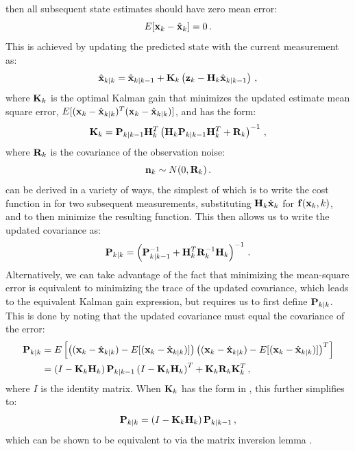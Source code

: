then all subsequent state estimates  should have zero mean error:
\begin{equation}
E[\mathbf x_k - \hat{\mathbf x}_k] = 0 \,.
\end{equation}
This is achieved by updating the predicted state with the current measurement as:
\begin{equation}
\hat{\mathbf x}_{k|k} = \hat{\mathbf x}_{k|k-1} + \mathbf K_k \left( \mathbf z_k - \mathbf H_k \hat{\mathbf x}_{k|k-1}\right)\,,
\end{equation}
where $\mathbf K_k$ is the optimal Kalman gain that minimizes the updated estimate mean square error, $E[(\mathbf x_k - \hat{\mathbf x}_{k|k})^T(\mathbf x_k - \hat{\mathbf x}_{k|k})]$, and has the form:
\begin{equation}\label{eq:KalmanGain}
\mathbf K_k = \mathbf P_{k|k-1} \mathbf H_k^T \left(\mathbf H_k \mathbf P_{k|k-1} \mathbf H_k^T + \mathbf R_k\right)^{-1} \,,
\end{equation}
where $\mathbf R_k$ is the covariance of the observation noise:
\begin{equation}
\mathbf n_k \sim N(0,\mathbf R_k) \,.
\end{equation}
 can be derived in a variety of ways, the simplest of which is to write the cost function in  for two subsequent measurements, substituting $\mathbf H_k \hat{\mathbf x}_k$ for $\mathbf f(\mathbf x_k,k)$, and to then minimize the resulting function.  This then allows us to write the updated covariance as:
\begin{equation} \label{eq:covUpdate}
\mathbf P_{k|k} = \left(\mathbf P_{k|k-1}^{-1} + \mathbf H_k^T \mathbf R_k^{-1} \mathbf H_k \right)^{-1} \,.
\end{equation}
Alternatively, we can take advantage of the fact that minimizing the mean-square error is equivalent to minimizing the trace of the updated covariance, which leads to the equivalent Kalman gain expression, but requires us to first define $\mathbf P_{k|k}$.  This is done by noting that the updated covariance must equal the covariance of the error:
\begin{align}
\mathbf P_{k|k} &= E\left[\left((\mathbf x_k - \hat{\mathbf x}_{k|k}) - E[(\mathbf x_k - \hat{\mathbf x}_{k|k})]\right)\left((\mathbf x_k - \hat{\mathbf x}_{k|k}) - E[(\mathbf x_k - \hat{\mathbf x}_{k|k})]\right)^T\right] \\
&= \left(I - \mathbf K_k \mathbf H_k\right) \mathbf P_{k|k-1} \left(I - \mathbf K_k \mathbf H_k\right)^T + \mathbf K_k \mathbf R_k \mathbf K_k^T\,,
\end{align}
where $I$ is the identity matrix.
When $\mathbf K_k$ has the form in , this further simplifies to:
\begin{equation}
\mathbf P_{k|k} = \left(I - \mathbf K_k \mathbf H_k\right) \mathbf P_{k|k-1} \,,
\end{equation}
which can be shown to be equivalent to  via the matrix inversion lemma \citep{stengel1994optimal}.


